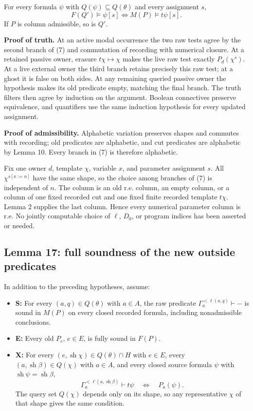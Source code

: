 \documentclass[
  11pt,
  letterpaper,
]{article}
\providecommand{\tightlist}{%
  \setlength{\itemsep}{0pt}\setlength{\parskip}{0pt}}
\begin{document}
For every formula \(\psi\) with \(Q(\psi)\subseteq Q(\theta)\) and every
assignment \(s\), \[
F(Q')\models\psi[s]\iff M(P)\models t\psi[s].
\tag{8}
\] If \(P\) is column admissible, so is \(Q'\).

\textbf{Proof of truth.} At an active modal occurrence the two raw tests
agree by the second branch of (7) and commutation of recording with
numerical closure. At a retained passive owner, erasure
\(t\chi\mapsto\chi\) makes the live raw test exactly \(P_d(\chi^s)\). At
a live external owner the third branch retains precisely this raw test;
at a ghost it is false on both sides. At any remaining queried passive
owner the hypothesis makes its old predicate empty, matching the final
branch. The truth filters then agree by induction on the argument.
Boolean connectives preserve equivalence, and quantifiers use the same
induction hypothesis for every updated assignment.

\textbf{Proof of admissibility.} Alphabetic variation preserves shapes
and commutes with recording; old predicates are alphabetic, and cut
predicates are alphabetic by Lemma 10. Every branch in (7) is therefore
alphabetic.

Fix one owner \(d\), template \(\chi\), variable \(x\), and parameter
assignment \(s\). All \(\chi^{s[x:=n]}\) have the same shape, so the
choice among branches of (7) is independent of \(n\). The column is an
old r.e. column, an empty column, or a column of one fixed recorded cut
and one fixed finite recorded template \(t\chi\). Lemma 2 supplies the
last column. Hence every numerical parameter column is r.e. No jointly
computable choice of \(\ell\), \(D_0\), or program indices has been
asserted or needed.

\subsection{Lemma 17: full soundness of the new outside
predicates}\label{lemma-17-full-soundness-of-the-new-outside-predicates}

In addition to the preceding hypotheses, assume:

\begin{itemize}
\tightlist
\item
  \textbf{S:} For every \((a,q)\in Q(\theta)\) with \(a\in A\), the raw
  predicate \(\Gamma_a^{<\ell(a,q)}\vdash-\) is sound in \(M(P)\) on
  every closed recorded formula, including nonadmissible conclusions.
\item
  \textbf{E:} Every old \(P_e\), \(e\in E\), is fully sound in \(F(P)\).
\item
  \textbf{X:} For every \((e,\operatorname{sh}\chi)\in Q(\theta)\cap H\)
  with \(e\in E\), every \((a,\operatorname{sh}\beta)\in Q(\chi)\) with
  \(a\in A\), and every closed source formula \(\psi\) with
  \(\operatorname{sh}\psi=\operatorname{sh}\beta\), \[
  \Gamma_a^{<\ell(a,\operatorname{sh}\beta)}\vdash t\psi
  \quad\Longleftrightarrow\quad P_a(\psi).
  \] The query set \(Q(\chi)\) depends only on its shape, so any
  representative \(\chi\) of that shape gives the same condition.
\end{itemize}
\end{document}
